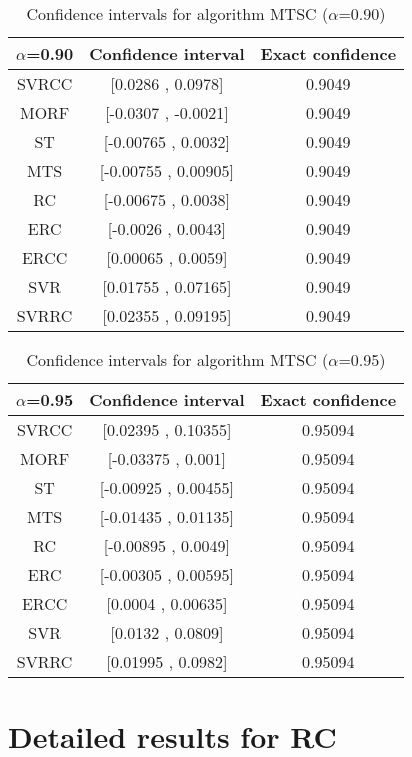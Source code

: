 \documentclass[a4paper,10pt]{article}
\begin{document}
\begin{table}[!htp]
\centering\small
\begin{tabular}{
|c|c|c|}
\hline
 $\alpha$=0.90 & Confidence interval & Exact confidence \\ \hline 
SVRCC & [0.0286 , 0.0978] & 0.9049\\ \hline 
MORF & [-0.0307 , -0.0021] & 0.9049\\ \hline 
ST & [-0.00765 , 0.0032] & 0.9049\\ \hline 
MTS & [-0.00755 , 0.00905] & 0.9049\\ \hline 
RC & [-0.00675 , 0.0038] & 0.9049\\ \hline 
ERC & [-0.0026 , 0.0043] & 0.9049\\ \hline 
ERCC & [0.00065 , 0.0059] & 0.9049\\ \hline 
SVR & [0.01755 , 0.07165] & 0.9049\\ \hline 
SVRRC & [0.02355 , 0.09195] & 0.9049\\ \hline 

\end{tabular}
\caption{Confidence intervals for algorithm MTSC ($\alpha$=0.90)}
\end{table}
\begin{table}[!htp]
\centering\small
\begin{tabular}{
|c|c|c|}
\hline
 $\alpha$=0.95 & Confidence interval & Exact confidence \\ \hline 
SVRCC & [0.02395 , 0.10355] & 0.95094\\ \hline 
MORF & [-0.03375 , 0.001] & 0.95094\\ \hline 
ST & [-0.00925 , 0.00455] & 0.95094\\ \hline 
MTS & [-0.01435 , 0.01135] & 0.95094\\ \hline 
RC & [-0.00895 , 0.0049] & 0.95094\\ \hline 
ERC & [-0.00305 , 0.00595] & 0.95094\\ \hline 
ERCC & [0.0004 , 0.00635] & 0.95094\\ \hline 
SVR & [0.0132 , 0.0809] & 0.95094\\ \hline 
SVRRC & [0.01995 , 0.0982] & 0.95094\\ \hline 

\end{tabular}
\caption{Confidence intervals for algorithm MTSC ($\alpha$=0.95)}
\end{table}

 \clearpage 


\section{Detailed results for RC}
\end{document}
